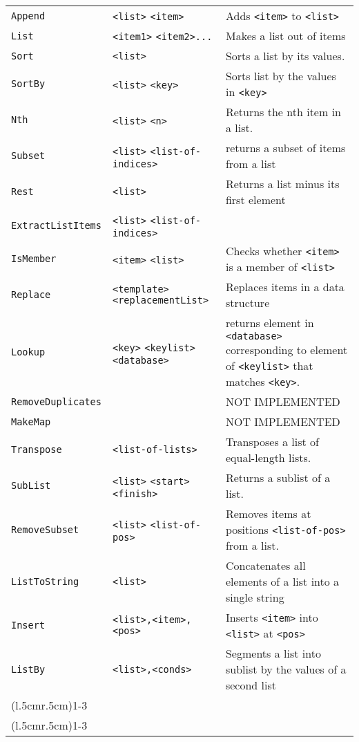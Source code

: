 \begin{longtable}{p{3cm}p{3cm}p{6cm}}
\verb+Append+ &\verb+<list>+ \verb+<item>+ & Adds \verb+<item>+ to \verb+<list>+ \\ 
\verb+List+ &\verb+<item1>+ \verb+<item2>...+ &Makes a list out of items\\ 
\verb+Sort+ &\verb+<list>+ &Sorts a list by its values. \\ 
\verb+SortBy+ &\verb+<list>+ \verb+<key>+ & Sorts list by the values in \verb+<key>+ \\ 
\verb+Nth+ &\verb+<list>+ \verb+<n>+ &Returns the nth item in a list.\\ 
\verb+Subset+ &\verb+<list>+ \verb+<list-of-indices>+ & returns a subset of items from a list\\ 
\verb+Rest+ & \verb+<list>+& Returns a list minus its first element\\
\verb+ExtractListItems+ &\verb+<list>+ \verb+<list-of-indices>+ & \\ 
\verb+IsMember+ &\verb+<item>+ \verb+<list>+ & Checks whether \verb+<item>+ is a member of \verb+<list>+ \\ 
\verb+Replace+ &\verb+<template>+ \verb+<replacementList>+ & Replaces items in a data structure\\ 
\verb+Lookup+& \verb+<key>+ \verb+<keylist>+ \verb+<database>+&returns
element in \verb+<database>+ corresponding to element of
\verb+<keylist>+ that matches \verb+<key>+.\\
\verb+RemoveDuplicates+ & & NOT IMPLEMENTED\\ 
\verb+MakeMap+ & & NOT IMPLEMENTED\\ 
\verb+Transpose+ &\verb+<list-of-lists>+ &Transposes a list of equal-length lists.\\ 
\verb+SubList+ &\verb+<list>+ \verb+<start>+ \verb+<finish>+ & Returns a sublist of a list.\\ 
\verb+RemoveSubset+ &\verb+<list>+ \verb+<list-of-pos>+ & Removes items at positions \verb+<list-of-pos>+ from a list.\\ 
\verb+ListToString+ &\verb+<list>+ & Concatenates all elements of a list into a single string\\
\verb+Insert+ & \verb+<list>,<item>,<pos>+ & Inserts \verb+<item>+ into \verb+<list>+ at \verb+<pos>+\\
\verb+ListBy+ & \verb+<list>,<conds>+ &Segments a list into sublist by the values of a second list\\

\addlinespace[0.2cm] 
\cmidrule(l{.5cm}r{.5cm}){1-3} 
\multicolumn{3}{c}{\textbf{String Management Functions}}\\ 
\cmidrule(l{.5cm}r{.5cm}){1-3} 


\end{longtable}
